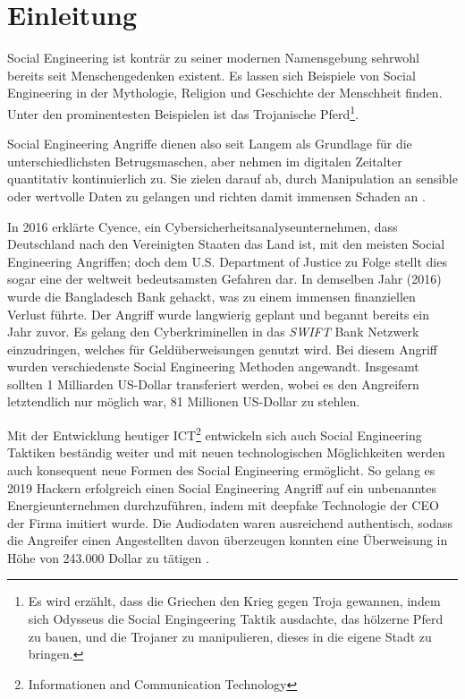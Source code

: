 \chapter{Einleitung}
\label{chapter:einleitung}

Social Engineering ist konträr zu seiner modernen Namensgebung sehrwohl bereits seit
Menschengedenken existent. Es lassen sich Beispiele von Social Engineering in der Mythologie,
Religion und Geschichte der Menschheit finden.
Unter den prominentesten Beispielen ist das Trojanische Pferd\footnote{Es wird erzählt, dass
die Griechen den Krieg gegen Troja gewannen,
indem sich Odysseus die Social Engingeering Taktik ausdachte, das hölzerne Pferd zu bauen,
und die Trojaner zu manipulieren, dieses in die eigene Stadt zu bringen.}.

Social Engineering Angriffe dienen also seit Langem als Grundlage für die unterschiedlichsten Betrugsmaschen,
aber nehmen im digitalen Zeitalter quantitativ kontinuierlich zu.
Sie zielen darauf ab, durch Manipulation an sensible oder wertvolle Daten zu gelangen
und richten damit immensen Schaden an .

In 2016 erklärte Cyence, ein Cybersicherheitsanalyseunternehmen, dass Deutschland nach den Vereinigten Staaten
das Land ist, mit den meisten Social Engineering Angriffen; doch dem U.S. Department of Justice zu Folge stellt
dies sogar eine der weltweit bedeutsamsten Gefahren dar.
In demselben Jahr (2016) wurde die Bangladesch Bank gehackt, was zu einem immensen finanziellen Verlust führte.
Der Angriff wurde langwierig geplant und begannt bereits ein Jahr zuvor.
Es gelang den Cyberkriminellen in das \textit{SWIFT} Bank Netzwerk einzudringen, welches für Geldüberweisungen
genutzt wird. Bei diesem Angriff wurden verschiedenste Social Engineering Methoden angewandt.
Insgesamt sollten 1 Milliarden US-Dollar transferiert werden, wobei es den Angreifern
letztendlich nur möglich war, 81 Millionen US-Dollar zu stehlen.

Mit der Entwicklung heutiger ICT\footnote{Informationen and Communication Technology} entwickeln sich auch
Social Engineering Taktiken beständig weiter und mit neuen technologischen Möglichkeiten werden auch
konsequent neue Formen des Social Engineering ermöglicht.
So gelang es 2019 Hackern erfolgreich einen Social Engineering Angriff auf ein unbenanntes Energieunternehmen
durchzuführen, indem mit deepfake Technologie der CEO der Firma imitiert wurde. Die Audiodaten waren ausreichend
authentisch, sodass die Angreifer einen Angestellten davon überzeugen konnten eine Überweisung in Höhe von
243.000 Dollar zu tätigen .

